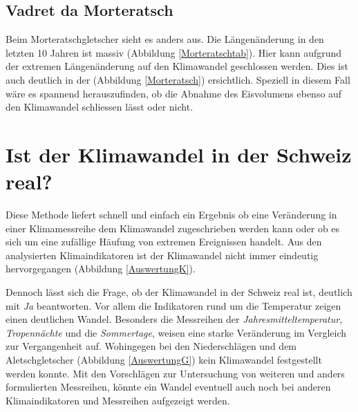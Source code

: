 \begin{refsection}
\subsection{Vadret da Morteratsch}
Beim Morteratschgletscher sieht es anders aus. Die Längenänderung in den letzten 10 Jahren ist massiv (Abbildung \ref{Morteratschtab}). Hier kann aufgrund der extremen Längenänderung auf den Klimawandel geschlossen werden. Dies ist auch deutlich in der (Abbildung \ref{Morteratsch}) ersichtlich. Speziell in diesem Fall wäre es spannend herauszufinden, ob die Abnahme des Eisvolumens ebenso auf den Klimawandel schliessen lässt oder nicht.





\section{Ist der Klimawandel in der Schweiz real?}
Diese Methode liefert schnell und einfach ein Ergebnis ob eine Veränderung in einer Klimamessreihe dem Klimawandel zugeschrieben werden kann oder ob es sich um eine zufällige Häufung von extremen Ereignissen handelt. Aus den analysierten Klimaindikatoren ist der Klimawandel nicht immer eindeutig hervorgegangen (Abbildung \ref{AuswertungK}). 

Dennoch lässt sich die Frage, ob der Klimawandel in der Schweiz real ist, deutlich mit \textit{Ja} beantworten. Vor allem die Indikatoren rund um die Temperatur zeigen einen deutlichen Wandel. Besonders die Messreihen der \textit{Jahresmitteltemperatur}, \textit{Tropennächte} und die \textit{Sommertage}, weisen eine starke Veränderung im Vergleich zur Vergangenheit auf. Wohingegen bei den Niederschlägen und dem Aletschgletscher (Abbildung \ref{AuswertungG}) kein Klimawandel festgestellt werden konnte. Mit den Vorschlägen zur Untersuchung von weiteren und anders formulierten Messreihen, könnte ein Wandel eventuell auch noch bei anderen Klimaindikatoren und Messreihen aufgezeigt werden.



\end{refsection}

